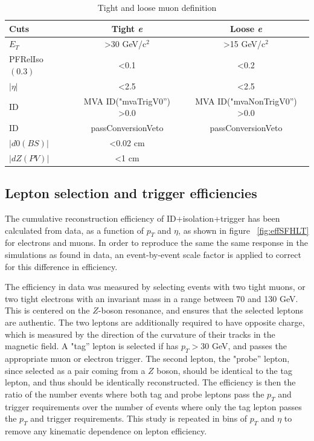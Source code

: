 \begin{table}[hbtp]\footnotesize
\centering
\begin{tabular}{|l|c|c|}
\hline\hline
Cuts & Tight \emph{e} & Loose \emph{e} \\
\hline
$E_{T}$ & \textgreater 30 GeV/c$^2$ & \textgreater 15 GeV/c$^2$ \\
\hline
PFRelIso$(0.3)$ & \textless 0.1 & \textless 0.2 \\
\hline
$|\eta|$ & \textless 2.5 & \textless 2.5 \\
\hline
ID & MVA ID("mvaTrigV0'') \textgreater 0.0 &  MVA ID("mvaNonTrigV0'') \textgreater 0.0\\
\hline
ID & passConversionVeto & passConversionVeto \\
\hline
$|d0(BS)|$ & \textless 0.02 cm & \\
\hline
$|dZ(PV)|$ & \textless 1 cm & \\
\hline\hline
\end{tabular}
\caption{Tight and loose muon definition}
\label{tab:TightLooseEleTable}
\end{table}


\subsection{Lepton selection and trigger efficiencies}
\label{trigger_efficiency_overview}

\par The cumulative reconstruction efficiency of ID+isolation+trigger
has been calculated from data, as a function of $p_{T}$ and $\eta$, as
shown in figure ~\ref{fig:effSFHLT} for electrons and muons.  In order
to reproduce the same the same response in the simulations as found in
data, an event-by-event scale factor is applied to correct for this
difference in efficiency.  

\par The efficiency in data was measured by selecting events with two
tight muons, or two tight electrons with an invariant mass in a range
between 70 and 130 GeV.  This is centered on the $Z$-boson resonance,
and ensures that the selected leptons are authentic.  The two leptons
are additionally required to have opposite charge, which is measured
by the direction of the curvature of their tracks in the magnetic
field.  A "tag'' lepton is selected if has $p_{T}>30$ GeV, and passes
the appropriate muon or electron trigger.  The second lepton, the
"probe'' lepton, since selected as a pair coming from a $Z$ boson,
should be identical to the tag lepton, and thus should be identically
reconstructed.  The efficiency is then the ratio of the number events where both
tag and probe leptons pass the $p_{T}$ and trigger requirements over
the number of events where only the tag lepton passes the $p_{T}$ and
trigger requirements.  This study is repeated in bins of $p_{T}$ and
$\eta$ to remove any kinematic dependence on lepton efficiency.  


